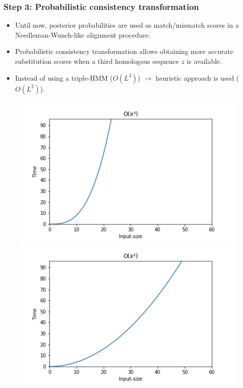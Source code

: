 \begin{frame}
    \frametitle{Step 3: Probabilistic consistency transformation}
    \begin{itemize}
		\item Until now, posterior probabilities are used as match/mismatch scores in a Needleman-Wunch-like alignment procedure.
		\item Probabilistic consistency transformation allows obtaining more accurate substitution scores when a third homologous sequence $z$ is available.
		\item Instead of using a triple-HMM ($O(L^3)$) $\rightarrow$ heuristic approach is used ($O(L^2)$).
	\end{itemize}
	\begin{figure}[t]
	\raggedleft
		\includegraphics[scale=0.385]{img/time-complexity3.png}
	\raggedright
		\includegraphics[scale=0.385]{img/time-complexity2.png}
	\end{figure}
\end{frame}

